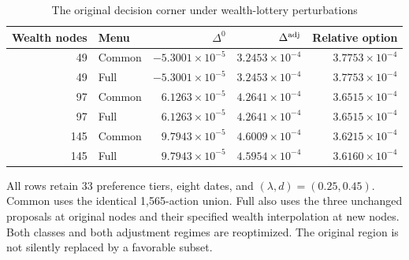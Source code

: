 \begin{table}[htbp]
\centering
\caption{The original decision corner under wealth-lottery perturbations}\label{tab:r8_spatial}
\small
\begin{tabular}{rlrrr}
\toprule
Wealth nodes & Menu & $\Delta^0$ & $\Delta^{\rm adj}$ & Relative option \\
\midrule
49 & Common & $-5.3001\times10^{-5}$ & $3.2453\times10^{-4}$ & $3.7753\times10^{-4}$ \\
49 & Full & $-5.3001\times10^{-5}$ & $3.2453\times10^{-4}$ & $3.7753\times10^{-4}$ \\
97 & Common & $6.1263\times10^{-5}$ & $4.2641\times10^{-4}$ & $3.6515\times10^{-4}$ \\
97 & Full & $6.1263\times10^{-5}$ & $4.2641\times10^{-4}$ & $3.6515\times10^{-4}$ \\
145 & Common & $9.7943\times10^{-5}$ & $4.6009\times10^{-4}$ & $3.6215\times10^{-4}$ \\
145 & Full & $9.7943\times10^{-5}$ & $4.5954\times10^{-4}$ & $3.6160\times10^{-4}$ \\
\bottomrule
\end{tabular}
\par\vspace{3pt}\begin{minipage}{0.96\textwidth}\footnotesize All rows retain 33 preference tiers, eight dates, and $(\lambda,d)=(0.25,0.45)$. Common uses the identical 1,565-action union. Full also uses the three unchanged proposals at original nodes and their specified wealth interpolation at new nodes. Both classes and both adjustment regimes are reoptimized. The original region is not silently replaced by a favorable subset.\end{minipage}
\end{table}
